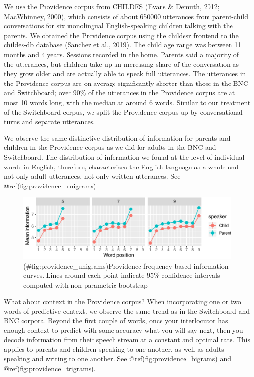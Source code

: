 \documentclass[11pt,]{article}
\begin{document}
We use the Providence corpus from CHILDES (Evans \& Demuth, 2012; MacWhinney, 2000), which consists of about 650000 utterances from parent-child conversations for six monolingual English-speaking children talking with the parents. We obtained the Providence corpus using the childesr frontend to the childes-db database (Sanchez et al., 2019). The child age range was between 11 months and 4 years. Sessions recorded in the home. Parents said a majority of the utterances, but children take up an increasing share of the conversation as they grow older and are actually able to speak full utterances. The utterances in the Providence corpus are on average significantly shorter than those in the BNC and Switchboard; over 90\% of the utterances in the Providence corpus are at most 10 words long, with the median at around 6 words. Similar to our treatment of the Switchboard corpus, we split the Providence corpus up by conversational turns and separate utterances.

We observe the same distinctive distribution of information for parents and children in the Providence corpus as we did for adults in the BNC and Switchboard. The distribution of information we found at the level of individual words in English, therefore, characterizes the English language as a whole and not only adult utterances, not only written utterances. See @ref(fig:providence\_unigrams).

\begin{figure}
\centering
\includegraphics{paper_files/figure-latex/providence_unigrams-1.pdf}
\caption{(\#fig:providence\_unigrams)Providence frequency-based information curves. Lines around each point indicate 95\% confidence intervals computed with non-parametric bootstrap}
\end{figure}

What about context in the Providence corpus? When incorporating one or two words of predictive context, we observe the same trend as in the Switchboard and BNC corpora. Beyond the first couple of words, once your interlocutor has enough context to predict with some accuracy what you will say next, then you decode information from their speech stream at a constant and optimal rate. This applies to parents and children speaking to one another, as well as adults speaking and writing to one another. See @ref(fig:providence\_bigrams) and @ref(fig:providence\_trigrams).
\end{document}
